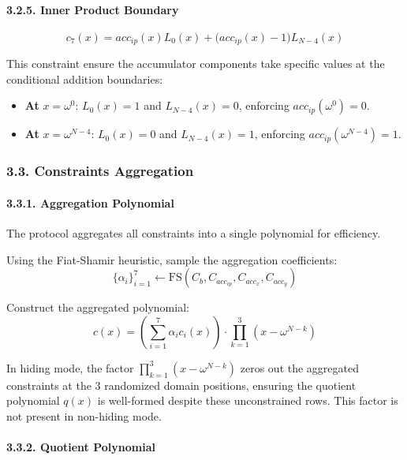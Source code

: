 \documentclass[
]{article}
\providecommand{\tightlist}{%
  \setlength{\itemsep}{0pt}\setlength{\parskip}{0pt}}
\begin{document}
\paragraph{3.2.5. Inner Product Boundary}\label{inner-product-boundary}

\[c_7(x) = acc_{ip}(x)L_0(x) + \bigl(acc_{ip}(x) - 1\bigr)L_{N-4}(x)\]

This constraint ensure the accumulator components take specific values
at the conditional addition boundaries:

\begin{itemize}
\tightlist
\item
  \textbf{At} \(x = \omega^0\): \(L_0(x) = 1\) and \(L_{N-4}(x) = 0\),
  enforcing \(acc_{ip}(\omega^0) = 0\).
\item
  \textbf{At} \(x = \omega^{N-4}\): \(L_0(x) = 0\) and
  \(L_{N-4}(x) = 1\), enforcing \(acc_{ip}(\omega^{N-4}) =1\).
\end{itemize}

\subsubsection{3.3. Constraints
Aggregation}\label{constraints-aggregation}

\paragraph{3.3.1. Aggregation Polynomial}\label{aggregation-polynomial}

The protocol aggregates all constraints into a single polynomial for
efficiency.

Using the Fiat-Shamir heuristic, sample the aggregation coefficients:
\[\{\alpha_i\}_{i=1}^7 \leftarrow \text{FS}(C_b, C_{acc_{ip}}, C_{acc_x}, C_{acc_y})\]

Construct the aggregated polynomial:
\[c(x) = \left(\sum_{i=1}^7 \alpha_i c_i(x)\right) \cdot \prod_{k=1}^3 \left(x - \omega^{N-k}\right)\]

In hiding mode, the factor
\(\prod_{k=1}^3 \left(x - \omega^{N-k}\right)\) zeros out the aggregated
constraints at the 3 randomized domain positions, ensuring the quotient
polynomial \(q(x)\) is well-formed despite these unconstrained rows.
This factor is not present in non-hiding mode.

\paragraph{3.3.2. Quotient Polynomial}\label{quotient-polynomial}
\end{document}
